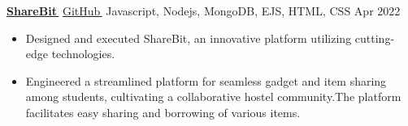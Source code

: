 \documentclass[letterpaper,11pt]{article}
\let\orighref\href
\renewcommand{\href}[2]{\orighref{#1}{#2\,\faExternalLink}}
\begin{document}
 \item{\href{https://github.com/shankar9834/ShareBit}{\textbf{ShareBit}} \ExternalLink \hspace{0.5em}\faGithub\hspace{0.2em}\href{https://github.com/shankar9834/ShareBit}{GitHub} \mid  \textup{Javascript, Nodejs, MongoDB, EJS, HTML, CSS}}  \hfill 
    {\textup{Apr 2022}}\\
    \vspace{-.3em}
    \begin{itemize}
        \item{
        Designed and executed ShareBit, an innovative platform utilizing cutting-edge technologies. 
        }
        \item{
        Engineered a streamlined platform for seamless gadget and item sharing among students, cultivating a collaborative hostel community.The platform facilitates easy sharing and borrowing of various items.
        }
        

    \end{itemize} 

\end{document}
